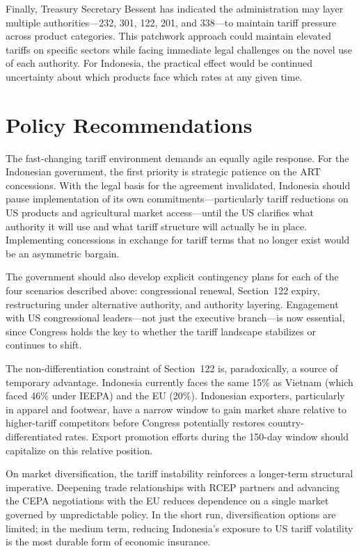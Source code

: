 \documentclass[12pt,a4paper]{article}
\begin{document}
Finally, Treasury Secretary Bessent has indicated the administration may layer multiple authorities---232, 301, 122, 201, and 338---to maintain tariff pressure across product categories. This patchwork approach could maintain elevated tariffs on specific sectors while facing immediate legal challenges on the novel use of each authority. For Indonesia, the practical effect would be continued uncertainty about which products face which rates at any given time.

\section{Policy Recommendations}

The fast-changing tariff environment demands an equally agile response. For the Indonesian government, the first priority is strategic patience on the ART concessions. With the legal basis for the agreement invalidated, Indonesia should pause implementation of its own commitments---particularly tariff reductions on US products and agricultural market access---until the US clarifies what authority it will use and what tariff structure will actually be in place. Implementing concessions in exchange for tariff terms that no longer exist would be an asymmetric bargain.

The government should also develop explicit contingency plans for each of the four scenarios described above: congressional renewal, Section~122 expiry, restructuring under alternative authority, and authority layering. Engagement with US congressional leaders---not just the executive branch---is now essential, since Congress holds the key to whether the tariff landscape stabilizes or continues to shift.

The non-differentiation constraint of Section~122 is, paradoxically, a source of temporary advantage. Indonesia currently faces the same 15\% as Vietnam (which faced 46\% under IEEPA) and the EU (20\%). Indonesian exporters, particularly in apparel and footwear, have a narrow window to gain market share relative to higher-tariff competitors before Congress potentially restores country-differentiated rates. Export promotion efforts during the 150-day window should capitalize on this relative position.

On market diversification, the tariff instability reinforces a longer-term structural imperative. Deepening trade relationships with RCEP partners and advancing the CEPA negotiations with the EU reduces dependence on a single market governed by unpredictable policy. In the short run, diversification options are limited; in the medium term, reducing Indonesia's exposure to US tariff volatility is the most durable form of economic insurance.
\end{document}
